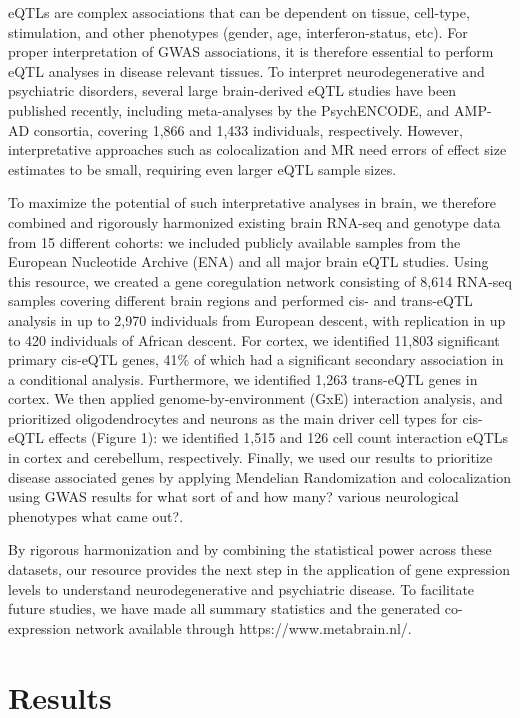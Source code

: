 eQTLs are complex associations that can be dependent on tissue, cell-type, stimulation, and other phenotypes (gender, age, interferon-status, etc). For proper interpretation of GWAS associations, it is therefore essential to perform eQTL analyses in disease relevant tissues. To interpret neurodegenerative and psychiatric disorders, several large brain-derived eQTL studies have been published recently, including meta-analyses by the PsychENCODE\cite{wangComprehensiveFunctionalGenomic2018a}, and AMP-AD\cite{rajIntegrativeTranscriptomeAnalyses2018} consortia, covering 1,866 and 1,433 individuals, respectively. However, interpretative approaches such as colocalization and MR need errors of effect size estimates to be small, requiring even larger eQTL sample sizes. 

To maximize the potential of such interpretative analyses in brain, we therefore combined and rigorously harmonized existing brain RNA-seq and genotype data from 15 different cohorts: we included publicly available samples from the European Nucleotide Archive (ENA) and all major brain eQTL studies. Using this resource, we created a gene coregulation network consisting of 8,614 RNA-seq samples covering different brain regions and performed cis- and trans-eQTL analysis in up to 2,970 individuals from European descent, with replication in up to 420 individuals of African descent. For cortex, we identified 11,803 significant primary cis-eQTL genes, 41\% of which had a significant secondary association in a conditional analysis. Furthermore, we identified 1,263 trans-eQTL genes in cortex. We then applied genome-by-environment (GxE) interaction analysis, and prioritized oligodendrocytes and neurons as the main driver cell types for cis-eQTL effects (Figure 1): we identified 1,515 and 126 cell count interaction eQTLs in cortex and cerebellum, respectively. Finally, we used our results to prioritize disease associated genes by applying Mendelian Randomization and colocalization using GWAS results for what sort of and how many? various neurological phenotypes what came out?.  

By rigorous harmonization and by combining the statistical power across these datasets, our resource provides the next step in the application of gene expression levels to understand neurodegenerative and psychiatric disease. To facilitate future studies, we have made all summary statistics and the generated co-expression network available through https://www.metabrain.nl/. 

\section{Results}
